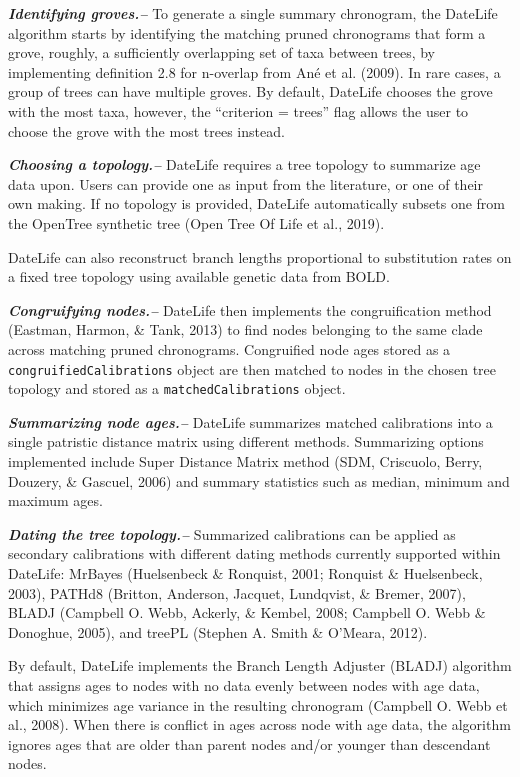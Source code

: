 \documentclass[
  english,
  man]{apa6}
\begin{document}
\emph{\textbf{Identifying groves.--}} To generate a single summary chronogram, the DateLife algorithm starts by identifying the matching pruned chronograms that form a grove, roughly, a sufficiently overlapping set of taxa between trees, by implementing definition 2.8 for n-overlap from Ané et al. (2009). In rare cases, a group of trees can have multiple groves. By default, DateLife chooses the grove with the most taxa, however, the ``criterion = trees'' flag allows the user to choose the grove with the most trees instead.

\emph{\textbf{Choosing a topology.--}} DateLife requires a tree topology to summarize age data upon. Users can provide one as input from the literature, or one of their own making. If no topology is provided, DateLife automatically subsets one from the OpenTree synthetic tree (Open Tree Of Life et al., 2019).

DateLife can also reconstruct branch lengths proportional to substitution rates on a fixed tree topology using available genetic data from BOLD.

\emph{\textbf{Congruifying nodes.--}} DateLife then implements the congruification method (Eastman, Harmon, \& Tank, 2013) to find nodes belonging to the same clade across matching pruned chronograms.
Congruified node ages stored as a \texttt{congruifiedCalibrations} object are then matched to nodes in the chosen tree topology and stored as a \texttt{matchedCalibrations} object.

\emph{\textbf{Summarizing node ages.--}} DateLife summarizes matched calibrations
into a single patristic distance matrix using different methods.
Summarizing options implemented include Super Distance Matrix method (SDM, Criscuolo, Berry, Douzery, \& Gascuel, 2006) and summary statistics such as median, minimum and maximum ages.

\emph{\textbf{Dating the tree topology.--}} Summarized calibrations can be applied as secondary calibrations with different dating methods currently supported within DateLife: MrBayes (Huelsenbeck \& Ronquist, 2001; Ronquist \& Huelsenbeck, 2003), PATHd8 (Britton, Anderson, Jacquet, Lundqvist, \& Bremer, 2007), BLADJ (Campbell O. Webb, Ackerly, \& Kembel, 2008; Campbell O. Webb \& Donoghue, 2005), and treePL (Stephen A. Smith \& O'Meara, 2012).

By default, DateLife implements the Branch Length Adjuster (BLADJ) algorithm that assigns ages to nodes with no data evenly between nodes with age data, which minimizes age variance in the resulting chronogram (Campbell O. Webb et al., 2008).
When there is conflict in ages across node with age data, the algorithm ignores ages that are older than parent nodes and/or younger than descendant nodes.
\end{document}
